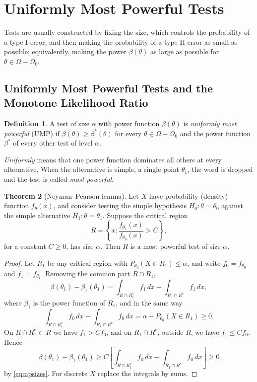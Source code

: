 \documentclass[12pt,a4paper]{report}
\theoremstyle{definition}
\newtheorem{thm}{Theorem}[section]
\newtheorem{defn}[thm]{Definition}
\begin{document}
\section{Uniformly Most Powerful Tests}

Tests are usually constructed by fixing the size, which controls the probability of
a type I error, and then making the probability of a type II error as small as
possible; equivalently, making the power $\beta(\theta)$ as large as possible for
$\theta\in\Omega - \Omega_0$.

\subsection{Uniformly Most Powerful Tests and the Monotone Likelihood Ratio}

\begin{defn}
\label{def:umpsi}
A test of size $\alpha$ with power function $\beta(\theta)$ is \emph{uniformly most
powerful} (UMP) if $\beta(\theta)\ge\beta^*(\theta)$ for every $\theta\in\Omega - \Omega_0$ and
the power function $\beta^*$ of every other test of level $\alpha$.
\end{defn}

\emph{Uniformly} means that one power function dominates all others at every
alternative. When the alternative is simple, a single point $\theta_1$, the word is
dropped and the test is called \emph{most powerful}.

\begin{thm}[Neyman--Pearson lemma]
\label{thm:npsi}
Let $X$ have probability (density) function $f_\theta(x)$, and consider testing the
simple hypothesis $H_0\colon\theta = \theta_0$ against the simple alternative
$H_1\colon\theta = \theta_1$. Suppose the critical region
\[R = \left\{x : \frac{f_{\theta_1}(x)}{f_{\theta_0}(x)}>C\right\},\]
for a constant $C\ge 0$, has size $\alpha$. Then $R$ is a most powerful test of size
$\alpha$.
\end{thm}

\begin{proof}
Let $R_1$ be any critical region with $P_{\theta_0}(X\in R_1)\le\alpha$, and write
$f_0 = f_{\theta_0}$ and $f_1 = f_{\theta_1}$. Removing the common part $R\cap R_1$,
\[\beta(\theta_1) - \beta_1(\theta_1) = \int_{R\cap R_1^c}f_1\,dx - \int_{R_1\cap R^c}f_1\,dx,\]
where $\beta_1$ is the power function of $R_1$, and in the same way
\begin{equation}
\label{eq:npsizes}
\int_{R\cap R_1^c}f_0\,dx - \int_{R_1\cap R^c}f_0\,dx = \alpha - P_{\theta_0}(X\in R_1)\ge 0 .
\end{equation}
On $R\cap R_1^c\subset R$ we have $f_1>Cf_0$, and on $R_1\cap R^c$, outside $R$, we have
$f_1\le Cf_0$. Hence
\[\beta(\theta_1) - \beta_1(\theta_1)\ge C\left[\int_{R\cap R_1^c}f_0\,dx - \int_{R_1\cap R^c}f_0\,dx\right]\ge 0\]
by \eqref{eq:npsizes}. For discrete $X$ replace the integrals by sums.
\end{proof}
\end{document}
